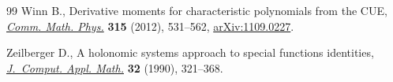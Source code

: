 \documentclass[pdftex]{sigma}
\numberwithin{equation}{section}
\theoremstyle{definition}
\begin{document}
\begin{thebibliography}{99}
Winn B., Derivative moments for characteristic polynomials from the {CUE},
 \href{https://doi.org/10.1007/s00220-012-1512-1}{\textit{Comm. Math. Phys.}}
 \textbf{315} (2012), 531--562,
 \href{http://arxiv.org/abs/1109.0227}{arXiv:1109.0227}.

Zeilberger D., A holonomic systems approach to special functions identities,
 \href{https://doi.org/10.1016/0377-0427(90)90042-X}{\textit{J.~Comput. Appl.
 Math.}} \textbf{32} (1990), 321--368.

\end{thebibliography}\LastPageEnding
\end{document}
